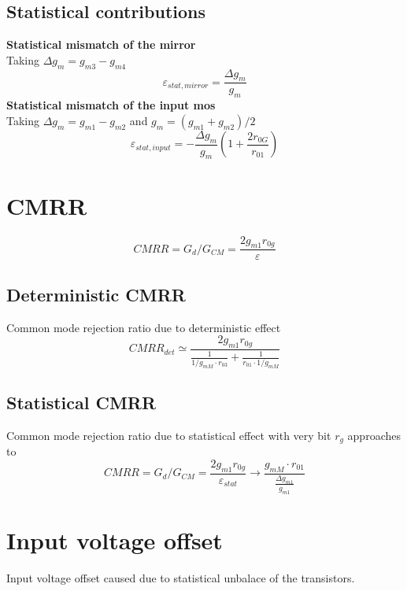 \subsection{Statistical contributions}
{\bf Statistical mismatch of the mirror}\\
Taking $\Delta g_{m}=g_{m3}-g_{m4}$ 
\begin{equation}
\varepsilon_{stat,mirror}=\frac{\Delta g_{m}}{g_{m}}
\end{equation}
{\bf Statistical mismatch of the input mos}\\
Taking $\Delta g_{m}=g_{m1}-g_{m2}$ and $g_{m}=(g_{m1}+g_{m2})/2$
\begin{equation}
\varepsilon_{stat,input}=-\frac{\Delta g_{m}}{g_{m}}(1+\frac{2r_{0G}}{r_{01}})
\end{equation}

\section{CMRR}
\begin{equation}
CMRR=G_d/G_{CM}=\frac{2g_{m1}r_{0g}}{\varepsilon}
\end{equation}

\subsection{Deterministic CMRR}
Common mode rejection ratio due to deterministic effect
\begin{equation}
CMRR_{det}\simeq \frac{2g_{m1}r_{0g}}{\frac{1}{1/g_{mM}\cdot r_{03}}+\frac{1}{r_{01}\cdot 1/g_{mM}}}
\end{equation}

\subsection{Statistical CMRR}
Common mode rejection ratio due to statistical effect with very bit $r_g$ approaches to
\begin{equation}
CMRR=G_d/G_{CM}=\frac{2g_{m1}r_{0g}}{\varepsilon_{stat}}\rightarrow \frac{g_{mM}\cdot r_01}{\frac{\Delta g_{m1}}{g_{m1}}}
\end{equation}

\section{Input voltage offset}
Input voltage offset caused due to statistical unbalace of the transistors.\\
